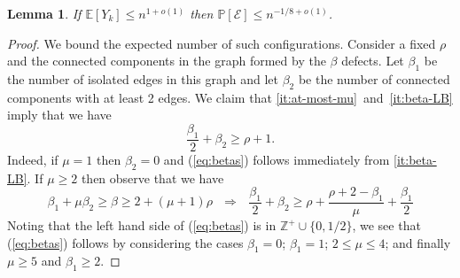 \documentclass[11pt]{article}
\newtheorem{lemma}[theorem]{Lemma}
\theoremstyle{definition}
\theoremstyle{remark}
\newcommand{\E}{\mathbb{E}}
\newcommand{\PP}{\mathbb{P}}
\newcommand{\cE}{\mathcal{E}}
\begin{document}
\begin{lemma}\label{lem:light-sets-covering-defects}
 If $\E [Y_k] \leq n^{1 + o(1)}$ then $ \PP[ \cE] \le n^{-1/8 + o(1)}$.
\end{lemma}
\begin{proof}
We bound the expected number of such configurations. 
Consider a fixed $ \rho $ and the connected components in the graph formed by the $ \beta$ defects. Let $ \beta_1$ be the number
of isolated edges in this graph and let $ \beta_2$ be the number of connected components with at least 2 edges.
We claim that \cref{it:at-most-mu}~and~\cref{it:beta-LB} imply that we have
\begin{equation} \frac{ \beta_1}{2} + \beta_2 \ge \rho + 1. \label{eq:betas} \end{equation}
Indeed, if $ \mu =1 $ then $ \beta_2 = 0$ and (\ref{eq:betas}) follows immediately from \cref{it:beta-LB}. If $ \mu \ge 2$ then observe
that we have
\[ \beta_1 + \mu \beta_2 \ge \beta \ge 2 + (\mu + 1) \rho \ \ \ \Rightarrow \ \ \
\frac{ \beta_1}{2} + \beta_2 \ge \rho+ \frac{ \rho +2 - \beta_1 }{ \mu} + \frac{ \beta_1}{2}
\]
Noting that the left hand side of (\ref{eq:betas}) is in $ {\mathbb Z}^+ \cup \{0,1/2\}$, we see that (\ref{eq:betas}) follows by considering the cases $ \beta_1=0$; $\beta_1=1$; $ 2 \le \mu \le 4$; and finally $ \mu \ge 5$ and $ \beta_1 \ge 2$.


\end{proof}
\end{document}

